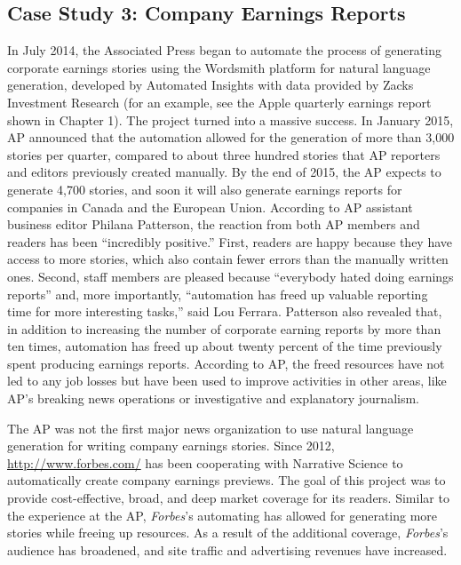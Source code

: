 \documentclass[notoc, symmetric, nobib, nols]{towcenter-guideto-book}
\begin{document}
\subsection{Case Study 3: Company Earnings Reports}
\begin{framed}
In July 2014, the Associated Press began to automate the process of generating corporate earnings stories using the Wordsmith platform for natural language generation, developed by Automated Insights with data provided by Zacks Investment Research (for an example, see the Apple quarterly earnings report shown in Chapter 1). The project turned into a massive success. In January 2015, AP announced that the automation allowed for the generation of more than 3,000 stories per quarter, compared to about three hundred stories that AP reporters and editors previously created manually. By the end of 2015, the AP expects to generate 4,700 stories, and soon it will also generate earnings reports for companies in Canada and the European Union. According to AP assistant business editor Philana Patterson, the reaction from both AP members and readers has been ``incredibly positive.''\autocite{white15} First, readers are happy because they have access to more stories, which also contain fewer errors than the manually written ones. Second, staff members are pleased because ``everybody hated doing earnings reports'' and, more importantly, ``automation has freed up valuable reporting time for more interesting tasks,'' said Lou Ferrara. Patterson also revealed that, in addition to increasing the number of corporate earning reports by more than ten times, automation has freed up about twenty percent of the time previously spent producing earnings reports. According to AP, the freed resources have not led to any job losses but have been used to improve activities in other areas, like AP's breaking news operations or investigative and explanatory journalism.\autocite{white15}  

The AP was not the first major news organization to use natural language generation for writing company earnings stories. Since 2012, \href{Forbes.com}{http://www.forbes.com/} has been cooperating with Narrative Science to automatically create company earnings previews. The goal of this project was to provide cost-effective, broad, and deep market coverage for its readers. Similar to the experience at the AP, \textit{Forbes}'s automating has allowed for generating more stories while freeing up resources. As a result of the additional coverage, \textit{Forbes}'s audience has broadened, and site traffic and advertising revenues have increased.\autocite{ns13}
\end{framed}
\end{document}
